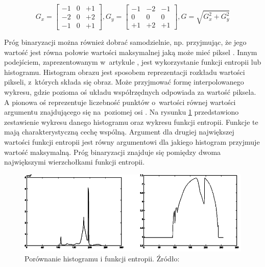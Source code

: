 \begin{equation}
G_{x} = \begin{bmatrix} -1 & 0 & +1 \\ -2 & 0 & +2 \\ -1 & 0 & +1 \end{bmatrix}, G_{y} = \begin{bmatrix} -1 & -2 & -1 \\ 0 & 0 & 0 \\ +1 & +2 & +1 \end{bmatrix},
G = \sqrt{ G_{x}^{2} + G_{y}^{2} } \label{eq:1}
\end{equation}

Próg binaryzacji można również dobrać samodzielnie, np. przyjmując, że jego wartość jest równa połowie wartości maksymalnej jaką może mieć piksel \cite{1}. Innym podejściem, zaprezentowanym w~artykule \cite{2}, jest wykorzystanie funkcji entropii lub histogramu.
Histogram obrazu jest sposobem reprezentacji rozkładu wartości pikseli, z~których składa się obraz. 
Może przyjmować formę interpolowanego wykresu, gdzie pozioma oś układu współrzędnych odpowiada za wartość piksela. 
A pionowa oś reprezentuje liczebność punktów o~wartości równej wartości argumentu znajdującego się na~poziomej osi \cite{histogram}.
Na rysunku \ref{fig:entr_hist} przedstawiono zestawienie wykresu danego histogramu oraz wykresu funkcji entropii. 
Funkcje te mają charakterystyczną cechę wspólną. 
Argument dla drugiej największej wartości funkcji entropii jest równy argumentowi dla jakiego histogram przyjmuje wartość maksymalną. Próg binaryzacji znajduje się pomiędzy dwoma największymi wierzchołkami funkcji entropii.

\begin{figure}[h]
	\includegraphics[scale=0.8]{Entropia.png}
	\caption{Porównanie histogramu i funkcji entropii. Źródło: \cite{2}}
	\label{fig:entr_hist}
\end{figure}

